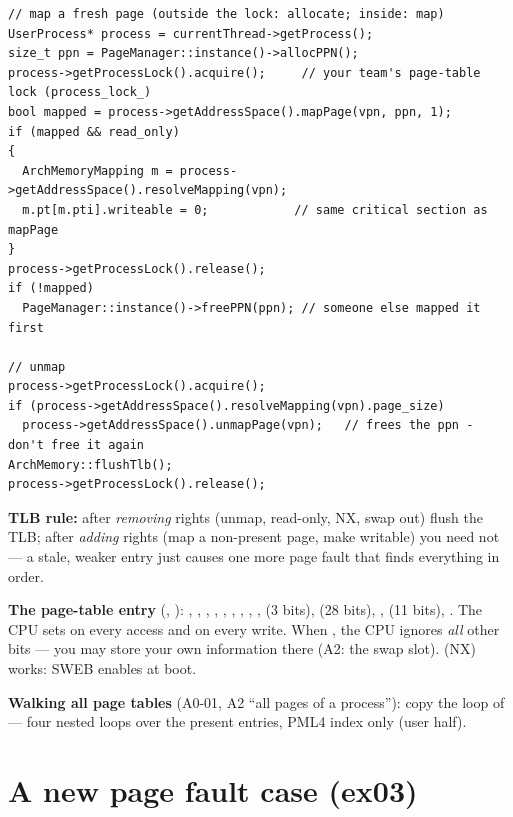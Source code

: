 \begin{lstlisting}[style=cpp]
// map a fresh page (outside the lock: allocate; inside: map)
UserProcess* process = currentThread->getProcess();
size_t ppn = PageManager::instance()->allocPPN();
process->getProcessLock().acquire();     // your team's page-table lock (process_lock_)
bool mapped = process->getAddressSpace().mapPage(vpn, ppn, 1);
if (mapped && read_only)
{
  ArchMemoryMapping m = process->getAddressSpace().resolveMapping(vpn);
  m.pt[m.pti].writeable = 0;            // same critical section as mapPage
}
process->getProcessLock().release();
if (!mapped)
  PageManager::instance()->freePPN(ppn); // someone else mapped it first

// unmap
process->getProcessLock().acquire();
if (process->getAddressSpace().resolveMapping(vpn).page_size)
  process->getAddressSpace().unmapPage(vpn);   // frees the ppn - don't free it again
ArchMemory::flushTlb();
process->getProcessLock().release();
\end{lstlisting}

\textbf{TLB rule:} after \emph{removing} rights (unmap, read-only, NX, swap out) flush the TLB;
after \emph{adding} rights (map a non-present page, make writable) you need not --- a stale,
weaker entry just causes one more page fault that finds everything in order.

\textbf{The page-table entry} (, ):
, , , ,
, , , , ,
 (3 bits),  (28 bits), , 
(11 bits), . The CPU sets  on every access and  on every
write. When , the CPU ignores \emph{all} other bits --- you may store your
own information there (A2: the swap slot).  (NX) works: SWEB enables
 at boot.

\textbf{Walking all page tables} (A0-01, A2 ``all pages of a process''): copy the loop of
 --- four nested loops over the present
entries, PML4 index  only (user half).

\section{A new page fault case (ex03)}
\label{sec:pagefault}

